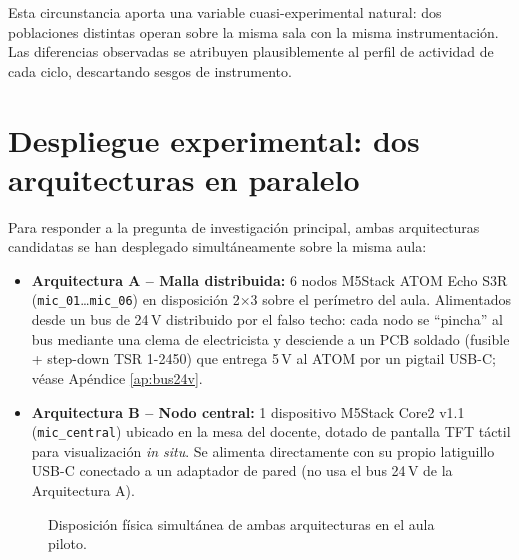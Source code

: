 \documentclass[11pt,a4paper,openany]{report}
\begin{document}
Esta circunstancia aporta una variable cuasi-experimental natural: dos poblaciones distintas operan sobre la misma sala con la misma instrumentaci\'on. Las diferencias observadas se atribuyen plausiblemente al perfil de actividad de cada ciclo, descartando sesgos de instrumento.

\section{Despliegue experimental: dos arquitecturas en paralelo}

Para responder a la pregunta de investigaci\'on principal, ambas arquitecturas candidatas se han desplegado simult\'aneamente sobre la misma aula:

\begin{itemize}
    \item \textbf{Arquitectura A -- Malla distribuida:} 6 nodos M5Stack ATOM Echo S3R (\texttt{mic\_01}\dots\texttt{mic\_06}) en disposici\'on 2$\times$3 sobre el per\'imetro del aula. Alimentados desde un bus de 24\,V distribuido por el falso techo: cada nodo se ``pincha'' al bus mediante una clema de electricista y desciende a un PCB soldado (fusible + step-down TSR 1-2450) que entrega 5\,V al ATOM por un pigtail USB-C; v\'ease Ap\'endice \ref{ap:bus24v}.
    \item \textbf{Arquitectura B -- Nodo central:} 1 dispositivo M5Stack Core2 v1.1 (\texttt{mic\_central}) ubicado en la mesa del docente, dotado de pantalla TFT t\'actil para visualizaci\'on \emph{in situ}. Se alimenta directamente con su propio latiguillo USB-C conectado a un adaptador de pared (no usa el bus 24\,V de la Arquitectura A).
\end{itemize}

\begin{figure}[H]
\centering
{}
\caption{Disposici\'on f\'isica simult\'anea de ambas arquitecturas en el aula piloto.}
\label{fig:layout}
\end{figure}
\end{document}
